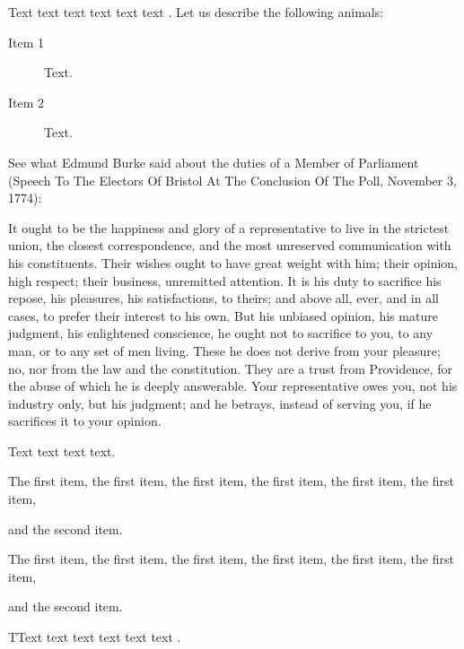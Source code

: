 Text text text text text text \citet{Wells2001}. Let us describe the following animals:

\begin{description}
\item[Item 1] Text.
\item[Item 2] Text.
\end{description}

See what Edmund Burke said about the duties of a Member of Parliament (Speech To The Electors Of Bristol At The Conclusion Of The Poll, November 3, 1774):

\begin{quotesmall}
It ought to be the happiness and glory of a representative to live in the strictest union, the closest correspondence, and the most unreserved communication with his constituents. 
Their wishes ought to have great weight with him; their opinion, high respect; their business, unremitted attention.
It is his duty to sacrifice his repose, his pleasures, his satisfactions, to theirs; and above all, ever, and in all cases, to prefer their interest to his own.
But his unbiased opinion, his mature judgment, his enlightened conscience, he ought not to sacrifice to you, to any man, or to any set of men living.
These he does not derive from your pleasure; no, nor from the law and the constitution.
They are a trust from Providence, for the abuse of which he is deeply answerable.
Your representative owes you, not his industry only, but his judgment; and he betrays, instead of serving you, if he sacrifices it to your opinion.
\end{quotesmall}

Text text text text.

\begin{listi}
	\item The first item, the first item, the first item, the first item, the first item, the first item,
	\item and the second item.
\end{listi}

\begin{lista}
	\item The first item, the first item, the first item, the first item, the first item, the first item, 
	\item and the second item.
\end{lista}

TText text text text text text \citet{Blomstrom2003}. 